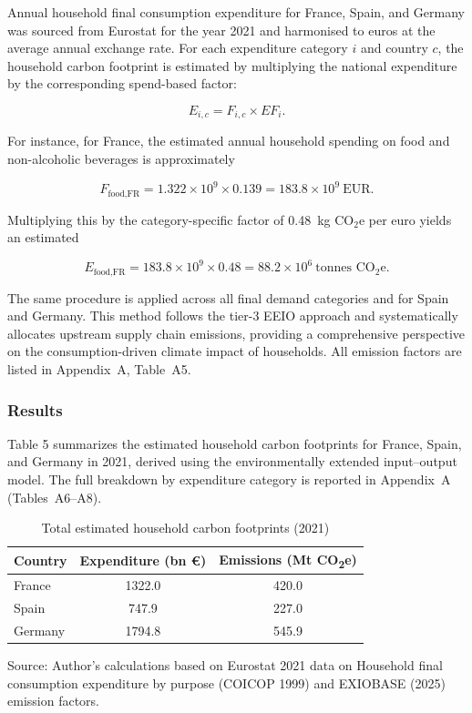 \documentclass[12pt,a4paper]{article}%
\begin{document}
Annual household final consumption expenditure for France, Spain, and Germany was sourced from Eurostat for the year 2021 and harmonised to euros at the average annual exchange rate. For each expenditure category $i$ and country $c$, the household carbon footprint is estimated by multiplying the national expenditure by the corresponding spend-based factor:

\begin{equation}
  E_{i,c} = F_{i,c} \times EF_i.
\end{equation}

For instance, for France, the estimated annual household spending on food and non-alcoholic beverages is approximately

\[
F_{\text{food,FR}} = 1.322 \times 10^9 \times 0.139 = 183.8 \times 10^9~\text{EUR}.
\]

Multiplying this by the category-specific factor of 0.48~kg CO$_2$e per euro yields an estimated

\[
E_{\text{food,FR}} = 183.8 \times 10^9 \times 0.48 = 88.2 \times 10^6~\text{tonnes CO}_2\text{e}.
\]

The same procedure is applied across all final demand categories and for Spain and Germany. This method follows the tier-3 EEIO approach and systematically allocates upstream supply chain emissions, providing a comprehensive perspective on the consumption-driven climate impact of households. All emission factors are listed in Appendix~A, Table~A5.

\subsubsection{Results}

Table 5 summarizes the estimated household carbon footprints for France, Spain, and Germany in 2021, derived using the environmentally extended input--output model. The full breakdown by expenditure category is reported in Appendix~A (Tables~A6--A8).

\begin{table}[h]
 \captionsetup{justification=raggedright,singlelinecheck=false} 
\caption{\small{Total estimated household carbon footprints (2021)}}
\begin{tabular}{lcc}
\toprule
\textbf\small{Country} & \textbf\small{Expenditure (bn €)} & \textbf\small{Emissions (Mt CO\textsubscript{2}e)} \\
\midrule
\small France & \small 1322.0 & \small 420.0 \\
\small Spain & \small 747.9 & \small 227.0 \\
\small Germany & \small 1794.8 & \small 545.9 \\
\bottomrule
\end{tabular}
\raggedright

\vspace{0.3cm}
\footnotesize{Source: Author's calculations based on Eurostat 2021 data on Household final consumption expenditure by purpose (COICOP 1999) and EXIOBASE (2025) emission factors.}
\end{table}
\end{document}
